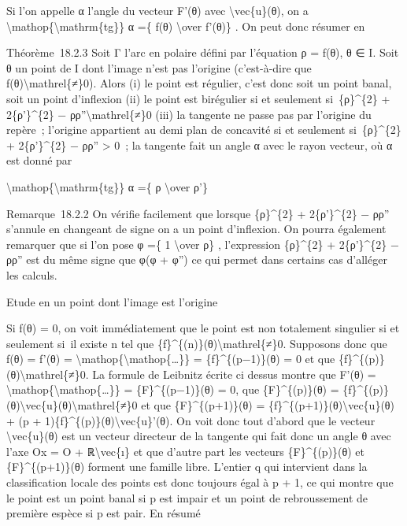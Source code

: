 \documentclass[]{article}
\begin{document}
Si l'on appelle α l'angle du vecteur F'(θ) avec
\textbackslash{}vec\{u\}(θ), on a
\textbackslash{}mathop\{\textbackslash{}mathrm\{tg\}\} α =\{ f(θ)
\textbackslash{}over f'(θ)\} . On peut donc résumer en

Théorème~18.2.3 Soit Γ l'arc en polaire défini par l'équation ρ = f(θ),
θ ∈ I. Soit θ un point de I dont l'image n'est pas l'origine
(c'est-à-dire que f(θ)\textbackslash{}mathrel\{≠\}0). Alors (i) le point
est régulier, c'est donc soit un point banal, soit un point d'inflexion
(ii) le point est birégulier si et seulement si~\{ρ\}\^{}\{2\} +
2\{ρ'\}\^{}\{2\} − ρρ''\textbackslash{}mathrel\{≠\}0 (iii) la tangente
ne passe pas par l'origine du repère~; l'origine appartient au demi plan
de concavité si et seulement si~\{ρ\}\^{}\{2\} + 2\{ρ'\}\^{}\{2\} − ρρ''
\textgreater{} 0~; la tangente fait un angle α avec le rayon vecteur, où
α est donné par

\textbackslash{}mathop\{\textbackslash{}mathrm\{tg\}\} α =\{ ρ
\textbackslash{}over ρ'\}

Remarque~18.2.2 On vérifie facilement que lorsque \{ρ\}\^{}\{2\} +
2\{ρ'\}\^{}\{2\} − ρρ'' s'annule en changeant de signe on a un point
d'inflexion. On pourra également remarquer que si l'on pose φ =\{ 1
\textbackslash{}over ρ\} , l'expression \{ρ\}\^{}\{2\} +
2\{ρ'\}\^{}\{2\} − ρρ'' est du même signe que φ(φ + φ'') ce qui permet
dans certains cas d'alléger les calculs.

Etude en un point dont l'image est l'origine

Si f(θ) = 0, on voit immédiatement que le point est non totalement
singulier si et seulement si~il existe n tel que
\{f\}\^{}\{(n)\}(θ)\textbackslash{}mathrel\{≠\}0. Supposons donc que
f(θ) = f'(θ) =
\textbackslash{}mathop\{\textbackslash{}mathop\{\ldots{}\}\} =
\{f\}\^{}\{(p−1)\}(θ) = 0 et que
\{f\}\^{}\{(p)\}(θ)\textbackslash{}mathrel\{≠\}0. La formule de Leibnitz
écrite ci dessus montre que F'(θ) =
\textbackslash{}mathop\{\textbackslash{}mathop\{\ldots{}\}\} =
\{F\}\^{}\{(p−1)\}(θ) = 0, que \{F\}\^{}\{(p)\}(θ) =
\{f\}\^{}\{(p)\}(θ)\textbackslash{}vec\{u\}(θ)\textbackslash{}mathrel\{≠\}0
et que \{F\}\^{}\{(p+1)\}(θ) =
\{f\}\^{}\{(p+1)\}(θ)\textbackslash{}vec\{u\}(θ) + (p +
1)\{f\}\^{}\{(p)\}(θ)\textbackslash{}vec\{u\}'(θ). On voit donc tout
d'abord que le vecteur \textbackslash{}vec\{u\}(θ) est un vecteur
directeur de la tangente qui fait donc un angle θ avec l'axe Ox = O +
ℝ\textbackslash{}vec\{ı\} et que d'autre part les vecteurs
\{F\}\^{}\{(p)\}(θ) et \{F\}\^{}\{(p+1)\}(θ) forment une famille libre.
L'entier q qui intervient dans la classification locale des points est
donc toujours égal à p + 1, ce qui montre que le point est un point
banal si p est impair et un point de rebroussement de première espèce si
p est pair. En résumé
\end{document}
